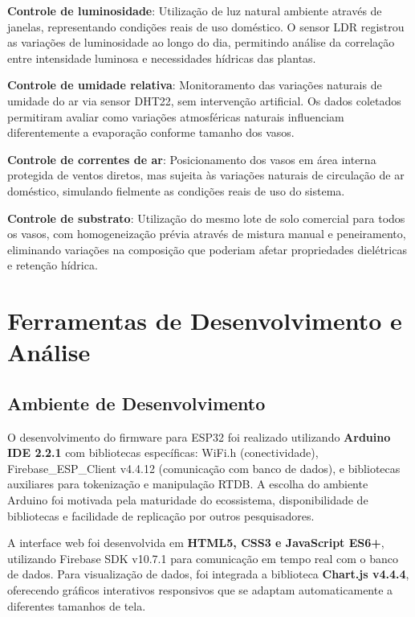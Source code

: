 \documentclass[twoside,english,brazilian]{UNISINOSmonografia}
\begin{document}
\textbf{Controle de luminosidade}: Utilização de luz natural ambiente através de janelas, representando condições reais de uso doméstico. O sensor LDR registrou as variações de luminosidade ao longo do dia, permitindo análise da correlação entre intensidade luminosa e necessidades hídricas das plantas.

\textbf{Controle de umidade relativa}: Monitoramento das variações naturais de umidade do ar via sensor DHT22, sem intervenção artificial. Os dados coletados permitiram avaliar como variações atmosféricas naturais influenciam diferentemente a evaporação conforme tamanho dos vasos.

\textbf{Controle de correntes de ar}: Posicionamento dos vasos em área interna protegida de ventos diretos, mas sujeita às variações naturais de circulação de ar doméstico, simulando fielmente as condições reais de uso do sistema.

\textbf{Controle de substrato}: Utilização do mesmo lote de solo comercial para todos os vasos, com homogeneização prévia através de mistura manual e peneiramento, eliminando variações na composição que poderiam afetar propriedades dielétricas e retenção hídrica.


\section{Ferramentas de Desenvolvimento e Análise}

\subsection{Ambiente de Desenvolvimento}

O desenvolvimento do firmware para ESP32 foi realizado utilizando \textbf{Arduino IDE 2.2.1} com bibliotecas específicas: WiFi.h (conectividade), Firebase\_ESP\_Client v4.4.12 (comunicação com banco de dados), e bibliotecas auxiliares para tokenização e manipulação RTDB. A escolha do ambiente Arduino foi motivada pela maturidade do ecossistema, disponibilidade de bibliotecas e facilidade de replicação por outros pesquisadores.

A interface web foi desenvolvida em \textbf{HTML5, CSS3 e JavaScript ES6+}, utilizando Firebase SDK v10.7.1 para comunicação em tempo real com o banco de dados. Para visualização de dados, foi integrada a biblioteca \textbf{Chart.js v4.4.4}, oferecendo gráficos interativos responsivos que se adaptam automaticamente a diferentes tamanhos de tela.
\end{document}
